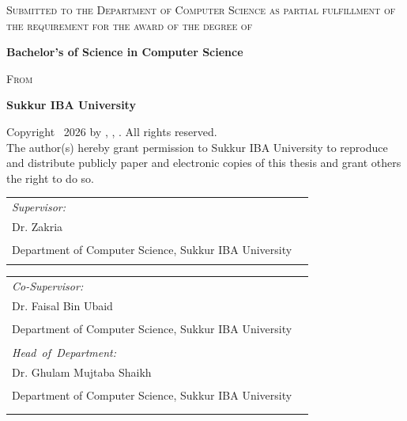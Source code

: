 \begin{titlepage}
\begin{center}
\medskip
\textsc{Submitted to the Department of Computer Science as
partial fulfillment of the requirement for the award of the degree of}

\medskip
{\titlestyle\bfseries\large{
Bachelor's of Science in Computer Science}

\medskip
{\textsc{From}}
\medskip

{{\titlestyle\bfseries\large{Sukkur IBA University}}}

\vspace{.2cm}
\makeatletter\@defencedate\makeatother
\vspace{.2cm}

{ \small{ Copyright \textcopyright\ 2026 by  %
\makeatletter
{\@authoronefirst}, {\@authortwofirst}, {\@authorthreefirst}.  %
\makeatother All rights reserved.} }\\

{\small{The author(s) hereby grant permission to Sukkur IBA University to reproduce and distribute publicly paper and electronic copies of this thesis and grant others the right to do so.}}}
\end{center}

\medskip

\medskip\noindent
\begin{tabular}{p{8cm}  r}
\mbox{\emph{Supervisor:}}                   & \\ 
Dr. Zakria             & \\
Department of Computer Science, Sukkur IBA University & \hspace{1cm}\rule{3.5cm}{1pt}\\
\end{tabular}
\medskip

\noindent
\begin{tabular}{p{8cm}  r}
\mbox{\emph{Co-Supervisor:}}                   & \\
Dr. Faisal Bin Ubaid                                          & \\
Department of Computer Science, Sukkur IBA University & \hspace{1cm}\rule{3.5cm}{1pt} \\
\medskip

\mbox{\emph{Head of Department:}} & \\
Dr. Ghulam Mujtaba Shaikh                      & \\
Department of Computer Science, Sukkur IBA University & \hspace{1cm}\rule{3.5cm}{1pt} \\
\medskip


\end{tabular}
\end{titlepage}

